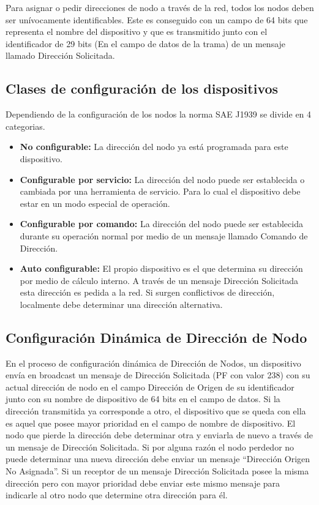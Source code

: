 Para asignar o pedir direcciones de nodo a través de la red, todos los nodos deben ser unívocamente identificables. Este es conseguido con un campo de 64 bits que representa el nombre del dispositivo y que es transmitido junto con el identificador de 29 bits (En el campo de datos de la trama) de un mensaje llamado Dirección Solicitada. 

\subsection{Clases de configuración de los dispositivos}
Dependiendo de la configuración de los nodos la norma SAE J1939 se divide en 4 categorias.
\begin{itemize}
\item \textbf{No configurable:} La dirección del nodo ya está programada para este dispositivo.
\item \textbf{Configurable por servicio:} La dirección del nodo puede ser establecida o cambiada por una herramienta de servicio. Para lo cual el dispositivo debe estar en un modo especial de operación.
\item \textbf{Configurable por comando:} La dirección del nodo puede ser establecida durante su operación normal por medio de un mensaje llamado Comando de Dirección.
\item \textbf{Auto configurable:} El propio dispositivo es el que determina su dirección por medio de cálculo interno. A través de un mensaje Dirección Solicitada esta dirección es pedida a la red. Si surgen conflictivos de dirección, localmente debe determinar una dirección alternativa.
\end{itemize}

\subsection{Configuración Dinámica de Dirección de Nodo}
En el proceso de configuración dinámica de Dirección de Nodos, un dispositivo envía en broadcast un mensaje  de Dirección Solicitada (PF con valor 238) con su actual dirección de nodo en el campo Dirección de Origen de su identificador junto con su nombre de dispositivo de 64 bits en el campo de datos. Si la dirección transmitida ya corresponde a otro, el dispositivo que se queda con ella es aquel que posee mayor prioridad en el campo de nombre de dispositivo. El nodo que pierde la dirección debe determinar otra y enviarla de nuevo a través de un mensaje de Dirección Solicitada. Si por alguna razón el nodo perdedor no puede determinar una nueva dirección debe enviar un mensaje “Dirección Origen No Asignada”. Si un receptor de un mensaje Dirección Solicitada posee la misma dirección pero con mayor prioridad debe enviar este mismo mensaje para indicarle al otro nodo que determine otra dirección para él.

